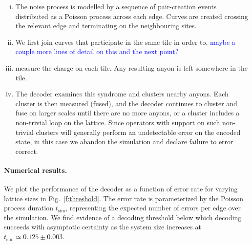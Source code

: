\documentclass[aps, prl, letterpaper, twocolumn, superscriptaddress, notitlepage, 10pt]{revtex4-1}
\newcommand{\Fref}[1]{Fig.~\ref{#1}}
\newcommand{\cggb}[1]{\textcolor{blue}{#1}}
\begin{document}
\begin{enumerate}[i)]
	\item The noise process is modelled by a sequence of pair-creation events distributed as 
	a Poisson process across each edge. Curves are created crossing the relevant edge 
	and terminating on the neighbouring sites.
	\item We first join curves that participate in the same tile in order to, 
	\cggb{maybe a couple more lines of detail on this and the next point?}
	\item measure the charge on each tile. Any resulting anyon is left somewhere in the tile.
	\item The decoder examines this syndrome and clusters nearby anyons. Each cluster 
	is then measured (fused), and the decoder continues to cluster and fuse on larger 
	scales until there are no more anyons, or a cluster includes a non-trivial loop on the 
	lattice. Since operators with support on such non-trivial clusters will generally perform an 
	undetectable error on the encoded state, in this case we abandon the simulation and 
	declare failure to error correct.
\end{enumerate}

\paragraph{Numerical results.}

We plot the performance of the decoder as a function of error rate for varying lattice sizes in 
\Fref{f:threshold}. The error rate is parameterized by the Poisson process duration 
$t_{\mathrm{sim}}$, representing the expected number of errors per edge over the simulation. 
We find evidence of a decoding threshold below which decoding succeeds with asymptotic 
certainty as the system size increases at $t_{\mathrm{sim}}\simeq 0.125 \pm 0.003$.
\end{document}
